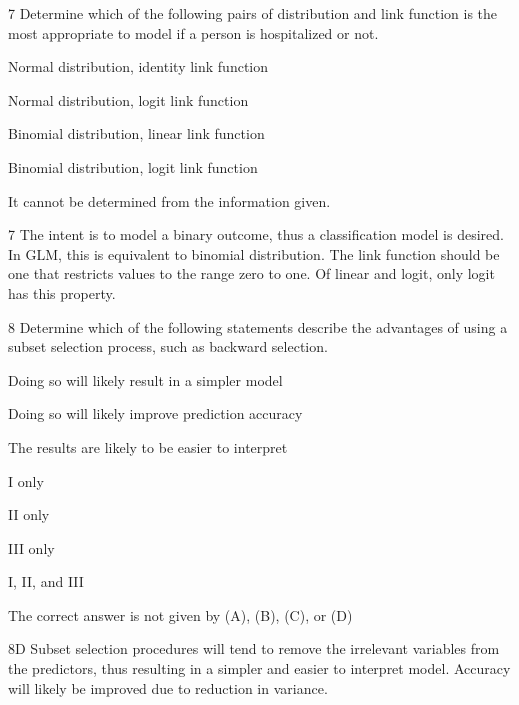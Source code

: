 \begin{question}{7}
Determine which of the following pairs of distribution and link function is the most appropriate to model if a person is hospitalized or not.

\begin{choices}
\item Normal distribution, identity link function
\item Normal distribution, logit link function
\item Binomial distribution, linear link function
\item Binomial distribution, logit link function
\item It cannot be determined from the information given.
\end{choices}
\end{question}
\begin{solution}{7}{}
The intent is to model a binary outcome, thus a classification model is desired. In GLM, this is equivalent to binomial distribution. The link function should be one that restricts values to the range zero to one. Of linear and logit, only logit has this property.
\end{solution}

\begin{question}{8}
Determine which of the following statements describe the advantages of using a subset selection process, such as backward selection.
\begin{statements}
\item Doing so will likely result in a simpler model
\item Doing so will likely improve prediction accuracy
\item The results are likely to be easier to interpret
\end{statements}

\begin{choices}
\item I only
\item II only
\item III only
\item I, II, and III
\item The correct answer is not given by (A), (B), (C), or (D)
\end{choices}
\end{question}
\begin{solution}{8}{D}
Subset selection procedures will tend to remove the irrelevant variables from the predictors, thus resulting in a simpler and easier to interpret model. Accuracy will likely be improved due to reduction in variance.
\end{solution}

